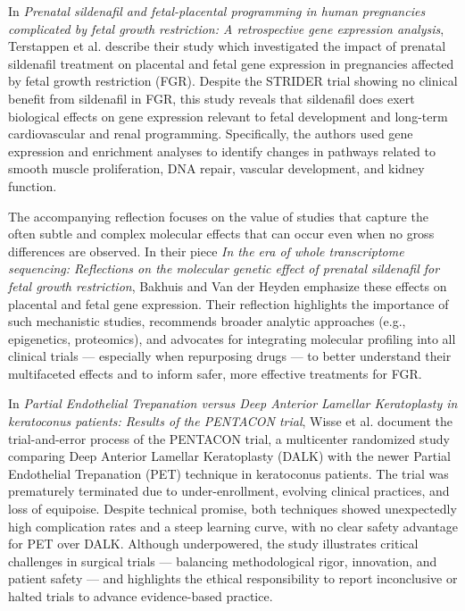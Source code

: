\documentclass[authordate, empirical]{jote-new-article}
\begin{document}
	In \emph{Prenatal sildenafil and fetal-placental programming in human pregnancies complicated by fetal growth restriction: A retrospective gene expression analysis}, Terstappen et al. describe their study which investigated the impact of prenatal sildenafil treatment on placental and fetal gene expression in pregnancies affected by fetal growth restriction (FGR). Despite the STRIDER trial showing no clinical benefit from sildenafil in FGR, this study reveals that sildenafil does exert biological effects on gene expression relevant to fetal development and long-term cardiovascular and renal programming. Specifically, the authors used gene expression and enrichment analyses to identify changes in pathways related to smooth muscle proliferation, DNA repair, vascular development, and kidney function.



	The accompanying reflection focuses on the value of studies that capture the often subtle and complex molecular effects that can occur even when no gross differences are observed. In their piece \emph{In the era of whole transcriptome sequencing: Reflections on the molecular genetic effect of prenatal sildenafil for fetal growth restriction}, Bakhuis and Van der Heyden emphasize these effects on placental and fetal gene expression. Their reflection highlights the importance of such mechanistic studies, recommends broader analytic approaches (e.g., epigenetics, proteomics), and advocates for integrating molecular profiling into all clinical trials — especially when repurposing drugs — to better understand their multifaceted effects and to inform safer, more effective treatments for FGR.



	In \emph{Partial Endothelial Trepanation versus Deep Anterior Lamellar Keratoplasty in keratoconus patients: Results of the PENTACON trial}, Wisse et al. document the trial-and-error process of the PENTACON trial, a multicenter randomized study comparing Deep Anterior Lamellar Keratoplasty (DALK) with the newer Partial Endothelial Trepanation (PET) technique in keratoconus patients. The trial was prematurely terminated due to under-enrollment, evolving clinical practices, and loss of equipoise. Despite technical promise, both techniques showed unexpectedly high complication rates and a steep learning curve, with no clear safety advantage for PET over DALK. Although underpowered, the study illustrates critical challenges in surgical trials — balancing methodological rigor, innovation, and patient safety — and highlights the ethical responsibility to report inconclusive or halted trials to advance evidence-based practice.
\end{document}
